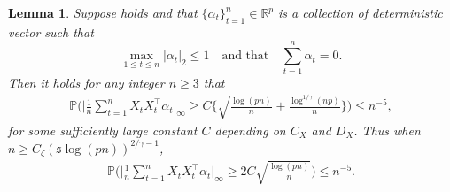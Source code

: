 \documentclass[11pt]{article}
\newcommand{\s}{ { \mathfrak{s}  } }
\newcommand{\p}{\mathbb P}
\theoremstyle{plain}
\newtheorem{lemma}[theorem]{Lemma}
\theoremstyle{definition}
\begin{document}
 
 
\begin{lemma} \label{lemma: mis-specified deviation}
Suppose    holds and that $ \{ \alpha_t \}_{t=1}^n \in \mathbb R^p$ is a collection of deterministic vector such that 
$$ \max_{1\le t \le n }  | \alpha_t |_2 \le 1  \quad \text{and that} \quad 
\sum_{t=1}^n \alpha_t = 0. $$ Then it holds for any integer $n \geq 3$ that 
\begin{align*}
  \p\bigg(   \bigg | \frac{1}{n}\sum_{t=1}^n X_{t } X^\top _{t}\alpha_t  \bigg |_\infty  \ge  C  \bigg\{  \sqrt { \frac{\log(pn) }{n}  }  +   \frac{ \log^{1/\gamma }(np) }{n} \bigg \}  \bigg)   \leq   n^{-5},
\end{align*}
for some sufficiently large constant $C$ depending on $C_X$ and $D_{X}$.
Thus when $ n \ge C_\zeta( \s \log(pn) )^{2/\gamma-1}$,
\begin{align*}
  \p\bigg(   \bigg | \frac{1}{n}\sum_{t=1}^n X_{t } X^\top _{t}\alpha_t  \bigg |_\infty  \ge  2C     \sqrt { \frac{\log(pn) }{n}  }   \bigg)   \leq   n^{-5}  .
\end{align*}   
\end{lemma} 
 
 
 
\end{document}
